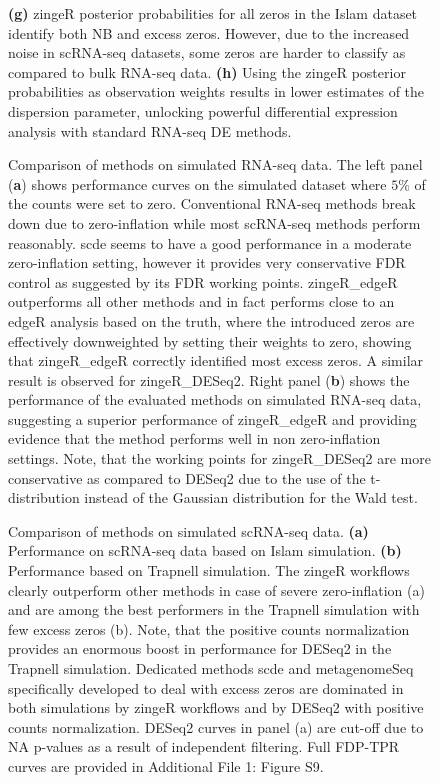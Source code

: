 \documentclass{bmcart}
\begin{document}
\begin{backmatter}
\begin{figure}[h!]
{	\textbf{(g)} zingeR posterior probabilities for all zeros in the Islam dataset identify both NB and excess zeros. However, due to the increased noise in scRNA-seq datasets, some zeros are harder to classify as compared to bulk RNA-seq data.
	\textbf{(h)} Using the zingeR posterior probabilities as observation weights results in lower estimates of the dispersion parameter, unlocking powerful differential expression analysis with standard RNA-seq DE methods.
	}
	\label{fig:introBCV}
\end{figure}

\begin{figure}[h!]
	\center
	\caption{ Comparison of methods on simulated RNA-seq data. 
		The left panel (\textbf{a}) shows performance curves on the simulated dataset where $5\%$ of the counts were set to zero. Conventional RNA-seq methods break down due to zero-inflation while most scRNA-seq methods perform reasonably. scde seems to have a good performance in a moderate zero-inflation setting, however it provides very conservative FDR control as suggested by its FDR working points. zingeR\_edgeR outperforms all other methods and in fact performs close to an edgeR analysis based on the truth, where the introduced zeros are effectively downweighted by setting their weights to zero, showing that zingeR\_edgeR correctly identified most excess zeros. A similar result is observed for zingeR\_DESeq2.
	Right panel (\textbf{b}) shows the performance of the evaluated methods on simulated RNA-seq data, suggesting a superior performance of zingeR\_edgeR and providing evidence that the method performs well in non zero-inflation settings. Note, that the working points for zingeR\_DESeq2 are more conservative as compared to DESeq2 due to the use of the t-distribution instead of the Gaussian distribution for the Wald test.
	}
	\label{fig:RNASeqPerf}
\end{figure}



\begin{figure}[h!]
	\center
	\caption{Comparison of methods on simulated scRNA-seq data. 
	\textbf{(a)} Performance on scRNA-seq data based on Islam simulation. 
	\textbf{(b)} Performance based on Trapnell simulation. 
	The zingeR workflows clearly outperform other methods in case of severe zero-inflation (a) and are among the best performers in the Trapnell simulation with few excess zeros (b). Note, that the positive counts normalization provides an enormous boost in performance for DESeq2 in the Trapnell simulation. Dedicated methods  scde and metagenomeSeq specifically developed to deal with excess zeros are dominated in both simulations by zingeR workflows and by DESeq2 with positive counts normalization. DESeq2 curves in panel (a) are cut-off due to NA p-values as a result of independent filtering. Full FDP-TPR curves are provided in Additional File 1: Figure S9.}
	\label{fig:scRNASeqPerf}
\end{figure}



\end{backmatter}
\end{document}
